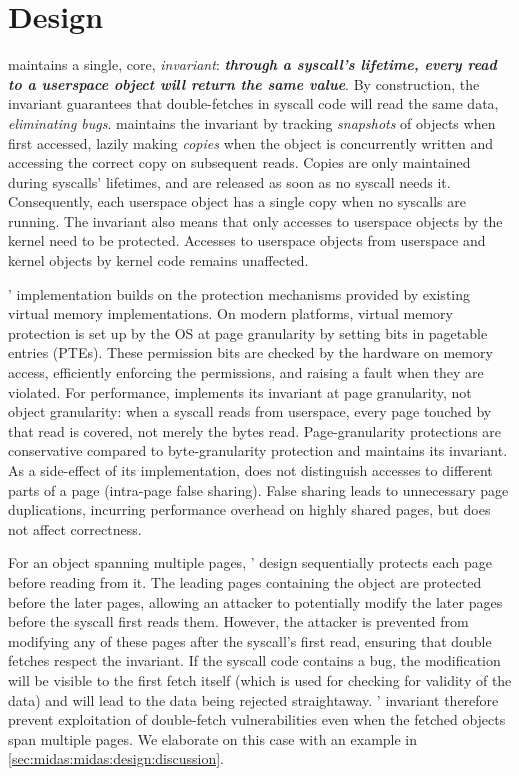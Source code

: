 \section{\midas Design}
\label{sec:midas:midas:design}

\midas maintains a single, core, \emph{invariant}:
\textbf{\emph{through a syscall's lifetime, every read to a userspace object
will return the same value}}.
By construction, the invariant guarantees that double-fetches in syscall
code will read the same data, \emph{eliminating \tocttou bugs}.
\midas maintains the invariant by tracking \emph{snapshots} of objects
when first accessed, lazily making \emph{copies} when the object is concurrently
written and accessing the correct copy on subsequent reads.
Copies are only maintained during syscalls' lifetimes, and are released as
soon as no syscall needs it.
Consequently, each userspace object has a single copy when no syscalls are
running.
The invariant also means that only accesses to userspace objects by the kernel
need to be protected.
Accesses to userspace objects from userspace and kernel objects by kernel
code remains unaffected.

\midas' implementation builds on the protection mechanisms provided by
existing virtual memory implementations.
On modern platforms, virtual memory protection is set up by the OS at
page granularity by setting bits in pagetable entries (PTEs).
These permission bits are checked by the hardware on memory access,
efficiently enforcing the permissions, and raising a fault when they
are violated.
For performance, \midas implements its invariant at page granularity, not object
granularity: when a syscall reads from userspace, every page touched by that
read is covered, not merely the bytes read.
Page-granularity protections are conservative compared to byte-granularity
protection and \midas maintains its invariant.
As a side-effect of its implementation, \midas does not distinguish
accesses to different parts of a page (intra-page false sharing).
False sharing leads to unnecessary page duplications, incurring performance
overhead on highly shared pages, but does not affect correctness.

For an object spanning multiple pages, \midas' design sequentially
protects each page before reading from it.
The leading pages containing the object are protected before the
later pages, allowing an attacker to potentially modify the later
pages before the syscall first reads them.
However, the attacker is prevented from modifying any of these pages
after the syscall's first read, ensuring that double fetches respect
the invariant.
If the syscall code contains a \tocttou bug, the modification will
be visible to the first fetch itself (which is used for checking for
validity of the data) and will lead to the data being rejected
straightaway.
\midas' invariant therefore prevent exploitation of double-fetch
vulnerabilities even when the fetched objects span multiple pages.
We elaborate on this case with an example in 
\autoref{sec:midas:midas:design:discussion}.

